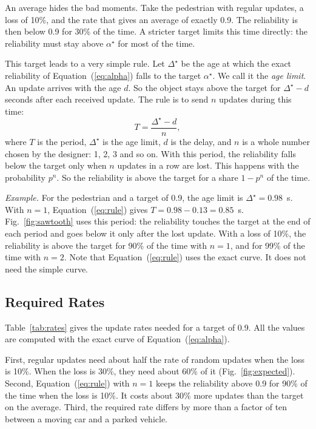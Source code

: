 \documentclass[conference]{IEEEtran}
\newcommand{\at}{\alpha^{\star}}             %
\newcommand{\Dl}{\Delta^{\star}}             %
\newcommand{\Eq}[1]{Equation~(\ref{#1})}     %
\begin{document}
An average hides the bad moments. Take the pedestrian with regular updates, a
loss of 10\%, and the rate that gives an average of exactly 0.9. The
reliability is then below 0.9 for 30\% of the time. A stricter target limits
this time directly: the reliability must stay above $\at$ for most of the
time.

This target leads to a very simple rule. Let $\Dl$ be the age at which the
exact reliability of \Eq{eq:alpha} falls to the target $\at$. We call it the
\emph{age limit}. An update arrives with the age $d$. So the object stays
above the target for $\Dl-d$ seconds after each received update. The rule is
to send $n$ updates during this time:
\begin{equation}\label{eq:rule}
T=\frac{\Dl-d}{n},
\end{equation}
where $T$ is the period, $\Dl$ is the age limit, $d$ is the delay, and $n$ is
a whole number chosen by the designer: 1, 2, 3 and so on. With this period,
the reliability falls below the target only when $n$ updates in a row are
lost. This happens with the probability $p^n$. So the reliability is above the
target for a share $1-p^n$ of the time.

\emph{Example.} For the pedestrian and a target of 0.9, the age limit is
$\Dl=0.98$~s. With $n=1$, \Eq{eq:rule} gives $T=0.98-0.13=0.85$~s.
Fig.~\ref{fig:sawtooth} uses this period: the reliability touches the target
at the end of each period and goes below it only after the lost update. With a
loss of 10\%, the reliability is above the target for 90\% of the time with
$n=1$, and for 99\% of the time with $n=2$. Note that \Eq{eq:rule} uses the
exact curve. It does not need the simple curve.

\subsection{Required Rates}

Table~\ref{tab:rates} gives the update rates needed for a target of 0.9. All
the values are computed with the exact curve of \Eq{eq:alpha}.

First, regular updates need about half the rate of random updates when the
loss is 10\%. When the loss is 30\%, they need about 60\% of it
(Fig.~\ref{fig:expected}). Second,
\Eq{eq:rule} with $n=1$ keeps the reliability above 0.9 for 90\% of the time
when the loss is 10\%. It costs about 30\% more updates than the target on the
average. Third, the required rate differs by more than a factor of ten between
a moving car and a parked vehicle.
\end{document}
